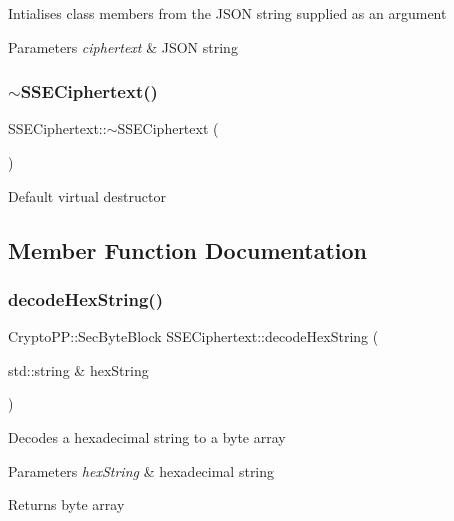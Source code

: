 Intialises class members from the J\+S\+ON string supplied as an argument 
\begin{DoxyParams}{Parameters}
{\em ciphertext} & J\+S\+ON string \\
\hline
\end{DoxyParams}
\mbox{\label{classSSECiphertext_a430e67e5f6deef79141accf4dc243ea4}} 
\subsubsection{\texorpdfstring{$\sim$\+S\+S\+E\+Ciphertext()}{~SSECiphertext()}}
{\footnotesize\ttfamily S\+S\+E\+Ciphertext\+::$\sim$\+S\+S\+E\+Ciphertext (\begin{DoxyParamCaption}{ }\end{DoxyParamCaption})\hspace{0.3cm}{\ttfamily [virtual]}}

Default virtual destructor 

\subsection{Member Function Documentation}
\mbox{\label{classSSECiphertext_af3a871206735d627f7fe7761097d307b}} 
\subsubsection{\texorpdfstring{decode\+Hex\+String()}{decodeHexString()}}
{\footnotesize\ttfamily Crypto\+P\+P\+::\+Sec\+Byte\+Block S\+S\+E\+Ciphertext\+::decode\+Hex\+String (\begin{DoxyParamCaption}\item[{std\+::string \&}]{hex\+String }\end{DoxyParamCaption})\hspace{0.3cm}{\ttfamily [private]}}

Decodes a hexadecimal string to a byte array 
\begin{DoxyParams}{Parameters}
{\em hex\+String} & hexadecimal string \\
\hline
\end{DoxyParams}
\begin{DoxyReturn}{Returns}
byte array 
\end{DoxyReturn}
\mbox{\label{classSSECiphertext_ac306ffad97bf6ee7093e0ca7f3929222}} 
